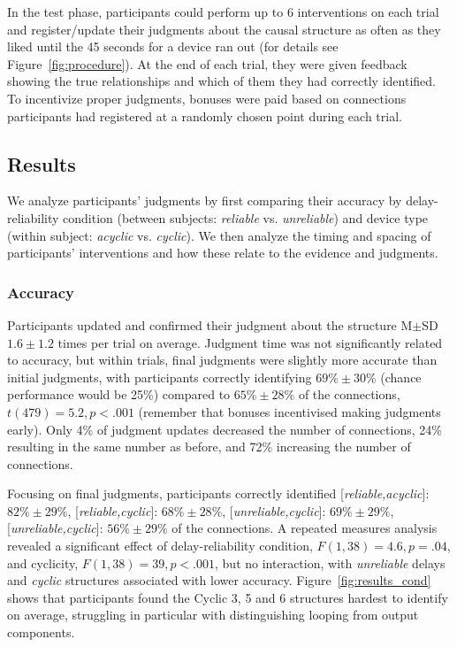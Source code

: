 \documentclass[10pt,letterpaper]{article}
\begin{document}
In the test phase, participants could perform up to 6 interventions on each trial and register/update their judgments about the causal structure as often as they liked until the 45 seconds for a device ran out (for details see Figure~\ref{fig:procedure}). At the end of each trial, they were given feedback showing the true relationships and which of them they had correctly identified. To incentivize proper judgments, bonuses were paid based on connections participants had registered at a randomly chosen point during each trial. 



\subsection{Results}
We analyze participants' judgments by first comparing their accuracy by delay-reliability condition (between subjects: \emph{reliable} vs. \emph{unreliable}) and device type (within subject: \emph{acyclic} vs. \emph{cyclic}).  We then analyze the timing and spacing of participants' interventions and how these relate to the evidence and judgments.


\subsubsection{Accuracy}

Participants updated and confirmed their judgment about the structure M$\pm$SD $1.6\pm1.2$ times per trial on average.  Judgment time was not significantly related to accuracy, but within trials, final judgments were slightly more accurate than initial judgments, with participants correctly identifying $69\%\pm30$\% (chance performance would be 25\%) compared to $65\%\pm28$\% of the connections, $t(479) = 5.2, p<.001$ (remember that bonuses incentivised making judgments early). 
Only 4\% of judgment updates decreased the number of connections, 24\% resulting in the same number as before, and 72\% increasing the number of connections.

Focusing on final judgments, participants correctly identified [\emph{reliable,acyclic}]: $82\%\pm29\%$,  [\emph{reliable,cyclic}]: $68\%\pm28\%$,  [\emph{unreliable,cyclic}]: $69\%\pm29\%$,  [\emph{unreliable,cyclic}]: $56\%\pm29\%$ of the connections.  A repeated measures analysis revealed a significant effect of delay-reliability condition, $F(1, 38)=4.6, p=.04$, and cyclicity, $F(1, 38)= 39, p<.001$, but no interaction, with \emph{unreliable} delays and \emph{cyclic} structures associated with lower accuracy. Figure~\ref{fig:results_cond} shows that participants found the Cyclic 3, 5 and 6 structures hardest to identify on average, struggling in particular with distinguishing looping from output components.
\end{document}
